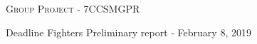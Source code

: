 \documentclass[10.25pt,a4paper,oneside]{article}
\begin{document}
{
\begin{center}
	\textsc{Group Project - 7CCSMGPR}
\end{center}
\begin{center}
	\hspace{0.5cm} Deadline Fighters \hspace{0.5 cm} Preliminary report - February 8, 2019
\end{center}
}
\end{document}

